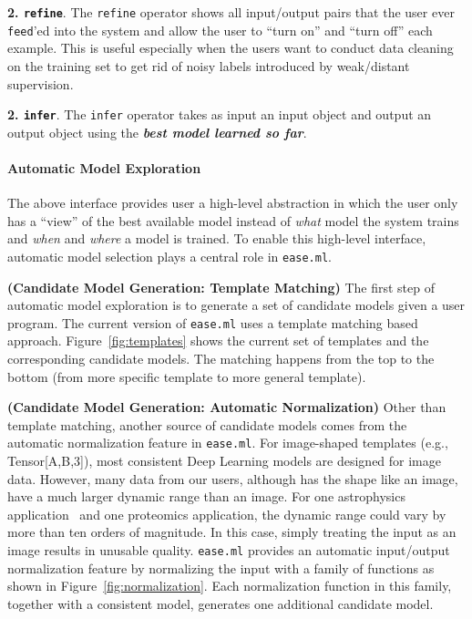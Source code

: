 \documentclass[letterpaper]{vldb}
\newcommand{\eml}{\texttt{ease.ml}\xspace}
\begin{document}
\noindent
{\textbf{2. \texttt{refine}}.} The \texttt{refine} operator
shows all input/output pairs that the user ever \texttt{feed}'ed
into the system and allow the user to ``turn on''
and ``turn off'' each example. This is useful especially when
the users want to conduct data cleaning on the training set
to get rid of noisy labels introduced by weak/distant supervision.

\noindent
{\textbf{2. \texttt{infer}}.} The \texttt{infer} operator
takes as input an input object and output an output object
using the \textbf{{\em best model learned so far}}.

\paragraph*{Automatic Model Exploration}

The above interface provides user a high-level abstraction
in which the user only has a ``view'' of the best available model
instead of {\em what} model the system trains and 
{\em when} and {\em where} a model is trained. To enable 
this high-level interface, automatic model selection plays a
central role in \eml.

\vspace{0.5em}
\noindent
{\bf (Candidate Model Generation: Template Matching)} 
The first step of automatic
model exploration is to generate a set of 
candidate models given a user program. The current
version of \eml uses a template matching based approach.
Figure~\ref{fig:templates} shows the current set of
templates and the corresponding candidate models. 
The matching happens from the top to the bottom 
(from more specific template to more general template).

\vspace{0.5em}
\noindent
{\bf (Candidate Model Generation: Automatic Normalization)} 
Other than template matching, another source of candidate models 
comes from the automatic normalization feature 
in \eml. For image-shaped templates (e.g., Tensor[A,B,3]),
most consistent Deep Learning models are designed for
image data. However, many data from our users, although
has the shape like an image, have a much larger dynamic
range than an image. For one astrophysics application~\cite{MNRAS}
and one proteomics application, the dynamic range could
vary by more than ten orders of magnitude. In this case,
simply treating the input as an image results in unusable 
quality. \eml provides an automatic input/output
normalization feature by normalizing the input
with a family of functions as shown in Figure~\ref{fig:normalization}.
Each normalization function in this family, together with 
a consistent model, generates one additional 
candidate model.
\end{document}
